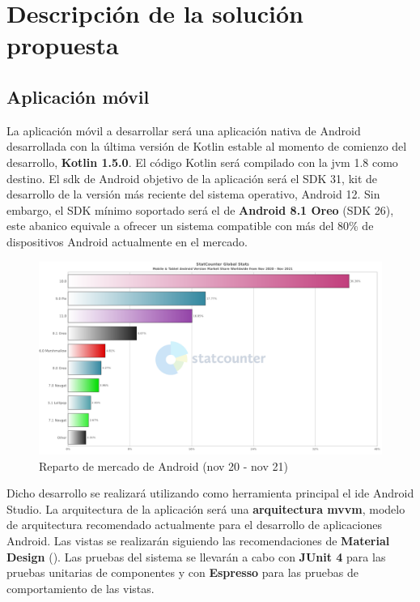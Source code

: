 \chapter{Descripción de la solución propuesta}
\label{ch:solucion_propuesta}

\section{Aplicación móvil}

La aplicación móvil a desarrollar será una aplicación nativa de Android desarrollada con la última versión de Kotlin estable al momento de comienzo del desarrollo, \textbf{Kotlin 1.5.0}. El código Kotlin será compilado con la \acrshort{jvm} 1.8 como destino. El \acrshort{sdk} de Android objetivo de la aplicación será el SDK 31, kit de desarrollo de la versión más reciente del sistema operativo, Android 12. Sin embargo, el SDK mínimo soportado será el de \textbf{Android 8.1 Oreo} (SDK 26), este abanico equivale a ofrecer un sistema compatible con más del 80\% de dispositivos Android actualmente en el mercado\cite{statcounter2021android}.

\begin{figure}[H]
    \centering
    \includegraphics[width=1\textwidth]{images/Introduccion/android-stat.png}
    \caption{Reparto de mercado de Android (nov 20 - nov 21)}
    \label{fig:android-stats}
\end{figure}

Dicho desarrollo se realizará utilizando como herramienta principal el \acrshort{ide} Android Studio. La arquitectura de la aplicación será una \textbf{arquitectura \acrshort{mvvm}}, modelo de arquitectura recomendado actualmente para el desarrollo de aplicaciones Android\cite{mvvm2021}.
Las vistas se realizarán siguiendo las recomendaciones de \textbf{Material Design} (). Las pruebas del sistema se llevarán a cabo con \textbf{JUnit 4} para las pruebas unitarias de componentes y con \textbf{Espresso} para las pruebas de comportamiento de las vistas. 

